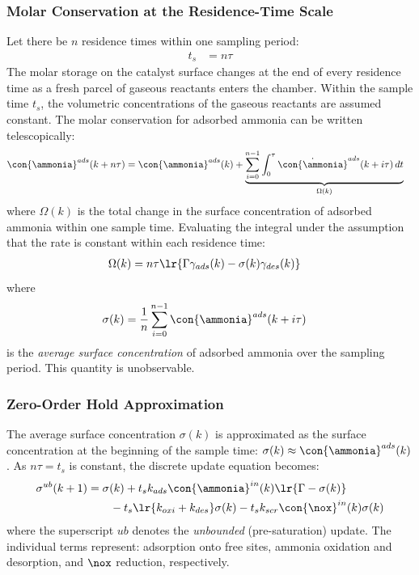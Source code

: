 \subsubsection{Molar Conservation at the Residence-Time Scale}
Let there be $n$ residence times within one sampling period:
\begin{align}
    t_s &= n \tau
    \label{eqn::ts_2_tau}
\end{align}
The molar storage on the catalyst surface changes at the end of every residence time as a fresh parcel of gaseous
reactants enters the chamber. Within the sample time $t_s$, the volumetric concentrations of the gaseous reactants are
assumed constant. The molar conservation for adsorbed ammonia can be written telescopically:
\begin{align*}
    \con{\ammonia}^{ads}(k + n\tau) &= \con{\ammonia}^{ads} (k)
        + \underbrace{\sum_{i=0}^{n-1} \int_{0}^{\tau} \dot{\con{\ammonia}}^{ads} (k + i\tau) \, dt}_{\Omega(k)}
\end{align*}
where $\Omega(k)$ is the total change in the surface concentration of adsorbed ammonia within one sample time.
Evaluating the integral under the assumption that the rate is constant within each residence time:
\begin{align}
    \Omega(k) &= n \tau \lr{\Gamma \gamma_{ads} (k) - \sigma(k) \gamma_{des} (k)}
    \label{eqn::omega}
\end{align}
where
\begin{align}
    \sigma(k) &= \frac{1}{n} \sum_{i=0}^{n-1} \con{\ammonia}^{ads} (k + i \tau)
    \label{eqn::sigma_def}
\end{align}
is the \textit{average surface concentration} of adsorbed ammonia over the sampling period. This quantity is unobservable.

\subsubsection{Zero-Order Hold Approximation}
The average surface concentration $\sigma(k)$ is approximated as the surface concentration at the beginning of the
sample time: $\sigma(k) \approx \con{\ammonia}^{ads}(k)$. As $n\tau = t_s$ is constant, the discrete update equation
becomes:
\begin{align}
    \sigma^{ub}(k+1) &= \sigma(k) + t_s k_{ads} \con{\ammonia}^{in} (k) \lr{\Gamma - \sigma(k)} \notag\\
        & \qquad - t_s \lr{k_{oxi} + k_{des}} \sigma(k) - t_s k_{scr} \con{\nox}^{in}(k) \sigma(k)
    \label{eqn::sigma_ub}
\end{align}
where the superscript $ub$ denotes the \textit{unbounded} (pre-saturation) update. The individual terms represent:
adsorption onto free sites, ammonia oxidation and desorption, and $\nox$ reduction, respectively.
